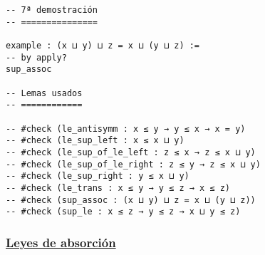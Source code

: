 \begin{verbatim}
-- 7ª demostración
-- ===============

example : (x ⊔ y) ⊔ z = x ⊔ (y ⊔ z) :=
-- by apply?
sup_assoc

-- Lemas usados
-- ============

-- #check (le_antisymm : x ≤ y → y ≤ x → x = y)
-- #check (le_sup_left : x ≤ x ⊔ y)
-- #check (le_sup_of_le_left : z ≤ x → z ≤ x ⊔ y)
-- #check (le_sup_of_le_right : z ≤ y → z ≤ x ⊔ y)
-- #check (le_sup_right : y ≤ x ⊔ y)
-- #check (le_trans : x ≤ y → y ≤ z → x ≤ z)
-- #check (sup_assoc : (x ⊔ y) ⊔ z = x ⊔ (y ⊔ z))
-- #check (sup_le : x ≤ z → y ≤ z → x ⊔ y ≤ z)
\end{verbatim}

\subsubsection{\href{./src/Basicos/Leyes\_de\_absorcion.lean}{Leyes de absorción}}
\label{sec:org878644e}
